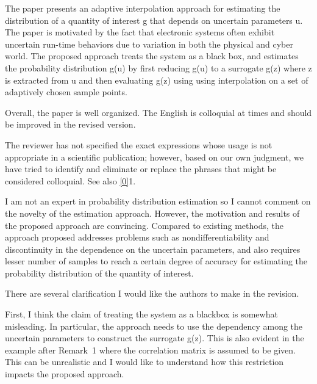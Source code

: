 \begin{reviewer}
The paper presents an adaptive interpolation approach for estimating the
distribution of a quantity of interest g that depends on uncertain parameters u.
The paper is motivated by the fact that electronic systems often  exhibit
uncertain run-time behaviors due to variation in both the physical and cyber
world. The proposed approach treats the system as a black box, and estimates the
probability distribution g(u) by first reducing g(u) to a surrogate g(z) where z
is extracted from u and then evaluating g(z) using using interpolation on a set
of adaptively chosen sample points.

Overall, the paper is well organized. The English is colloquial at times and
should be improved in the revised version.
\end{reviewer}

\begin{authors}
The reviewer has not specified the exact expressions whose usage is not
appropriate in a scientific publication; however, based on our own judgment, we
have tried to identify and eliminate or replace the phrases that might be
considered colloquial. See also \cref{0}{1}.

\begin{actions}
\end{actions}
\end{authors}

\begin{reviewer}
I am not an expert in probability distribution estimation so I cannot comment on
the novelty of the estimation approach. However, the motivation and results of
the proposed approach are convincing. Compared to existing methods, the approach
proposed addresses problems such as nondifferentiability and discontinuity in
the dependence on the uncertain parameters, and also requires lesser number of
samples to reach a certain degree of accuracy for estimating the probability
distribution of the quantity of interest.

There are several clarification I would like the authors to make in the
revision.

First, I think the claim of treating the system as a blackbox is somewhat
misleading. In particular, the approach needs to use the dependency among the
uncertain parameters to construct the surrogate g(z). This is also evident in
the example after Remark~1 where the correlation matrix is assumed to be given.
This can be unrealistic and I would like to understand how this restriction
impacts the proposed approach.
\end{reviewer}

